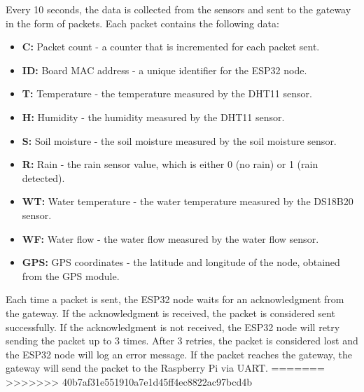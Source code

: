 Every 10 seconds, the data is collected from the sensors and sent to the gateway in the form of packets.
Each packet contains the following data:
\begin{itemize}
  \item \textbf{C:} Packet count - a counter that is incremented for each packet sent.
  \item \textbf{ID:} Board MAC address - a unique identifier for the ESP32 node.
  \item \textbf{T:} Temperature - the temperature measured by the DHT11 sensor.
  \item \textbf{H:} Humidity - the humidity measured by the DHT11 sensor.
  \item \textbf{S:} Soil moisture - the soil moisture measured by the soil moisture sensor.
  \item \textbf{R:} Rain - the rain sensor value, which is either 0 (no rain) or 1 (rain detected).
  \item \textbf{WT:} Water temperature - the water temperature measured by the DS18B20 sensor.
  \item \textbf{WF:} Water flow - the water flow measured by the water flow sensor.
  \item \textbf{GPS:} GPS coordinates - the latitude and longitude of the node, obtained from the GPS module.
\end{itemize}

Each time a packet is sent, the ESP32 node waits for an acknowledgment from the gateway. 
If the acknowledgment is received, the packet is considered sent successfully.
If the acknowledgment is not received, the ESP32 node will retry sending the packet up to 3 times. 
After 3 retries, the packet is considered lost and the ESP32 node will log an error message.
If the packet reaches the gateway, the gateway will send the packet to the Raspberry Pi via UART.
=======
>>>>>>> 40b7af31e551910a7e1d45ff4ec8822ac97bcd4b

